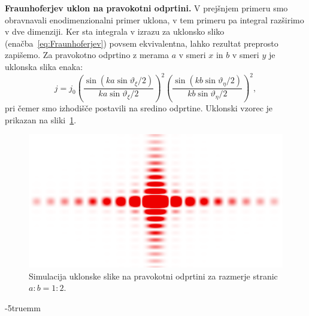\begin{example}{\bf Fraunhoferjev uklon na pravokotni odprtini.}
 V prejšnjem primeru smo obravnavali enodimenzionalni primer uklona, v tem
 primeru pa integral razširimo v dve dimenziji. Ker sta integrala v izrazu
 za uklonsko sliko (enačba~\ref{eq:Fraunhoferjev}) povsem ekvivalentna, 
 lahko rezultat preprosto zapišemo. Za pravokotno odprtino z merama 
 $a$ v smeri $x$ in $b$ v smeri $y$ je uklonska slika enaka:
 \begin{equation}
 j = j_0 \left(\frac{\sin\left(ka\sin \vartheta_\xi/2\right)}{ka\sin\vartheta_\xi/2}\right)^2
 \left(\frac{\sin\left(kb\sin \vartheta_\eta/2\right)}{kb\sin\vartheta_\eta/2}\right)^2\!\!,
 \end{equation}
 pri čemer smo izhodišče postavili na sredino odprtine. Uklonski vzorec
 je prikazan na sliki~\ref{fig:05_pravokot}.
 \begin{figure}[ht]
\centering
\includegraphics[width=100truemm]{slike/05_pravokot.png}
\caption{Simulacija uklonske slike na pravokotni odprtini
za razmerje stranic $a:b = 1:2$.}
\label{fig:05_pravokot}
\end{figure}
\vglue-5truemm

\end{example}

